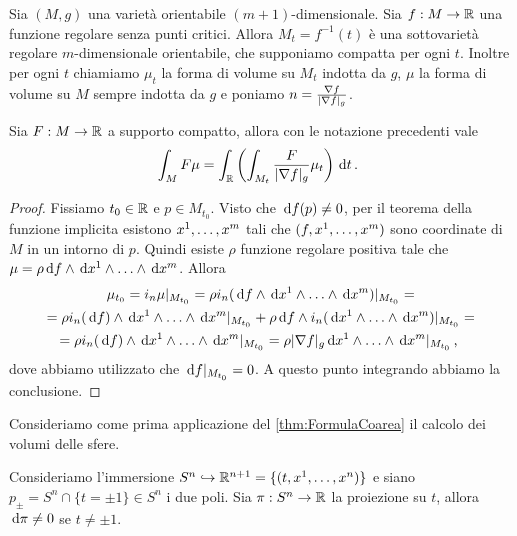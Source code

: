 Sia $(M,g)$ una varietà orientabile $(m+1)$-dimensionale. Sia $f:M \to \R$ una funzione regolare senza punti critici. Allora $M_t = f^{-1} (t)$ è una sottovarietà regolare $m$-dimensionale orientabile, che supponiamo compatta per ogni $t$.
Inoltre per ogni $t$ chiamiamo $\mu_t$ la forma di volume su $M_t$ indotta da $g$, $\mu$ la forma di volume su $M$ sempre indotta da $g$ e poniamo $n = \frac{\grad f}{\abs{\grad f}_g}$.

\begin{theorem}  \label{thm:FormulaCoarea} 
Sia $F:M \to \R$ a supporto compatto, allora con le notazione precedenti vale
\begin{equation*}
	\int_M F \mu = \int_\R \left( \int_{M_t} \frac F{\abs{\grad f}_g} \mu_t \right) \de t \punto
\end{equation*}
\end{theorem}

\begin{proof} %
	Fissiamo $t_0\in\R$ e $p\in M_{t_0}$. Visto che $\de f(p) \not = 0$, per il teorema della funzione implicita esistono $\seqa xm,$ tali che $(f, \seqa xm,)$ sono coordinate di $M$ in un intorno di $p$.
	Quindi esiste $\rho$ funzione regolare positiva tale che $\mu = \rho \de f \wedge \seqa {\de x}m\wedge$. Allora
	\begin{multline*}
		\mu_{t_0} = i_n \mu \restrict{M_{t_0}} = \rho i_n (\de f \wedge \seqa {\de x}m\wedge)\restrict{M_{t_0}} =\\
		= \rho i_n(\de f) \wedge \seqa {\de x}m\wedge \restrict{M_{t_0}} + \rho \de f \wedge i_n (\seqa {\de x}m\wedge)\restrict{M_{t_0}} =\\
		=\rho i_n(\de f) \wedge \seqa {\de x}m\wedge \restrict{M_{t_0}} =\rho \abs{\grad f}_g \seqa {\de x}m\wedge \restrict{M_{t_0}} \virgola
	\end{multline*}
	dove abbiamo utilizzato che $\de f\restrict {M_{t_0}} = 0$.
	A questo punto integrando abbiamo la conclusione.
\end{proof}

Consideriamo come prima applicazione del \cref{thm:FormulaCoarea} il calcolo dei volumi delle sfere.

Consideriamo l'immersione $S^n \hookrightarrow \R^{n+1} = \{(t,\seqa xn,)\}$ e siano $p_\pm = S^n\cap\{t=\pm 1\} \in S^n$ i due poli. Sia $\pi:S^n \to \R$ la proiezione su $t$, allora $\de \pi \not=0$ se $t\not=\pm 1$.

